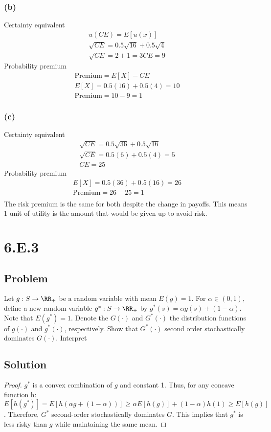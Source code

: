 \documentclass[10pt, a4paper]{article}
\begin{document}
      \subsubsection*{(b)}
        Certainty equivalent
          \begin{gather*}
            u(CE) = E[u(x)]\\
            \sqrt{CE} = 0.5\sqrt{16} + 0.5\sqrt{4}\\
            \sqrt{CE} = 2 + 1 = 3
            CE = 9
          \end{gather*}
        Probability premium
          \begin{gather*}
            \text{Premium} = E[X] - CE \\
            E[X] = 0.5(16) + 0.5(4) = 10 \\
            \text{Premium} = 10 - 9 = 1
          \end{gather*}
      \subsubsection*{(c)}
        Certainty equivalent
          \begin{gather*}
            \sqrt{CE} = 0.5\sqrt{36} + 0.5\sqrt{16} \\
            \sqrt{CE} = 0.5(6) + 0.5(4) = 5 \\
            CE = 25
          \end{gather*}
        Probability premium
          \begin{gather*}
            E[X] = 0.5(36) + 0.5(16) = 26 \\
            \text{Premium} = 26-25 = 1 \\
          \end{gather*}
        The risk premium is the same for both despite the change in payoffs. This means 1 unit of utility is the amount that would be given up to avoid risk.
  \section*{6.E.3}
    \subsection*{Problem}
      Let $g: S\rightarrow \RR_+$ be a random variable with mean $E(g) = 1$. For $\alpha\in(0,1)$, define a new random variable $g^*: S\rightarrow \RR_+$ by $g^*(s) = \alpha g(s) + (1-\alpha)$. Note that $E(g^*)=1$. Denote the $G(\cdot)$ and $G^*(\cdot)$ the distribution functions of $g(\cdot)$ and $g^*(\cdot)$, respectively. Show that $G^*(\cdot)$ second order stochastically dominates $G(\cdot)$. Interpret  
    \subsection*{Solution}
      \begin{proof}
        $g^*$ is a convex combination of $g$ and constant 1. Thus, for any concave function h: $E[h(g^*)] = E[h(\alpha g+(1-\alpha))]\geq\alpha E[h(g)]+(1-\alpha)h(1)\geq E[h(g)]$. Therefore, $G^*$ second-order stochastically dominates $G$. This implies that $g^*$ is less risky than $g$ while maintaining the same mean. 
      \end{proof}
\end{document}

